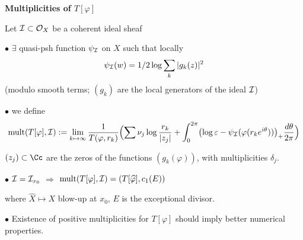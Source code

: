 \begin{slide}
\par\vspace{\bigskipamount}\noindent
{\large\bf Multiplicities of $T[\varphi]$}
\par\vspace{\bigskipamount}\noindent
Let ${\cal I}\subset {\cal O}_X$ be a coherent ideal sheaf

$\bullet$ $\exists$ quasi-psh function $\psi_{\cal I}$ on $X$ such that locally 
$$ \psi_{\cal I}(w)= 1/2 \log\sum_k\vert g_k(z)\vert ^2$$
\hskip 0.3cm (modulo smooth terms;  $(g_k)$ are the local generators of the ideal ${\cal I}$)

$\bullet$ we define
$${\rm mult} 
(T[\varphi], {\cal I})
:= \lim _{k\mapsto \infty}{{1}\over {T(\varphi, r_k)}}
\Bigl(\sum \nu_j\log {{r_k}\over 
{\vert z_j\vert}}+ 
\int_0^{2\pi}\bigl(\log\varepsilon-  \psi_{\cal I}( \varphi(r_ke^{i\theta}))\bigr)_+{{d\theta}\over {2\pi}}
\Bigr )$$

\hskip 0.3cm $(z_j)\subset \Cc$ are the zeros of the functions 
$(g_k(\varphi))$, with multiplicities $\delta_j$.

\par\vspace{\bigskipamount}\noindent 
$\bullet$ ${\cal I}= {\cal I}_{x_{0}}$ \hskip 0.3cm $\Longrightarrow$  \hskip 0.3cm
${\rm mult}(T[\varphi], {\cal I})= (T[\widehat \varphi], c_1(E))$ 

\hskip 0.3cm where $\widehat X\mapsto X$ blow-up at $x_0$, $E$ is the exceptional divisor.

\par\vspace{\bigskipamount}\noindent
$\bullet$ Existence of positive multiplicities for $T[\varphi]$ should 
imply better numerical properties.

\end{slide}

